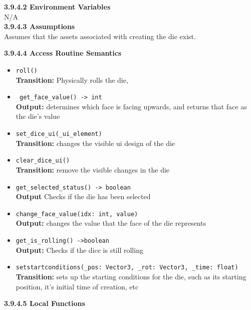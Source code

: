 \documentclass[12pt, titlepage]{article}
\begin{document}
\textbf{3.9.4.2 Environment Variables}\\

N/A\\


\textbf{3.9.4.3 Assumptions}\\
Assumes that the assets associated with creating the die exist. 

\textbf{3.9.4.4 Access Routine Semantics}
\begin{itemize}
	\item \texttt{roll() }\\
	\textbf{Transition:} Physically rolls the die, 
	
	\item \texttt{ get\_face\_value() -> int }\\
	\textbf{Output:} determines which face is facing upwards, and returns that face as the die's value
	
	\item \texttt{set\_dice\_ui(\_ui\_element) }\\
	\textbf{Transition:} changes the visible ui design of the die
	
	\item \texttt{clear\_dice\_ui() }\\
	\textbf{Transition:} remove the visible changes in the die
	
	\item \texttt{get\_selected\_status() -> boolean}\\
	\textbf{Output} Checks if the die has been selected
	
	\item \texttt{change\_face\_value(idx: int, value) }\\
	\textbf{Output:} changes the value that the face of the die represents
	
	\item \texttt{get\_is\_rolling() ->boolean }\\
	\textbf{Output:} Checks if the dice is still rolling
	
	\item \texttt{setstartconditions(\_pos: Vector3, \_rot: Vector3, \_time: float) }\\
	\textbf{Transition:} sets up the starting conditions for the die, such as its starting position, it's initial time of creation, etc
	


\end{itemize}

\textbf{3.9.4.5 Local Functions}
\end{document}
